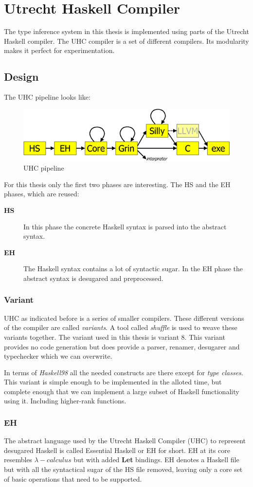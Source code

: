 \chapter{Utrecht Haskell Compiler}
The type inference system in this thesis is implemented using parts of the Utrecht Haskell compiler. The UHC compiler is a set of different compilers. Its modularity makes it perfect for experimentation.
\section{Design}
The UHC pipeline looks like:
\begin{figure}[H]
\includegraphics[scale=0.8]{ehc-dataflow2}
\caption{UHC pipeline}
\label{flow}
\end{figure}

For this thesis only the first two phases are interesting. The HS and the EH phases, which are reused:
\begin{description}
\item[\textbf{HS}] In this phase the concrete Haskell syntax is parsed into the abstract syntax. 
\item[\textbf{EH}] The Haskell syntax contains a lot of syntactic sugar. In the EH phase the abstract syntax is desugared and preprocessed.
\end{description}
\subsection{Variant}
UHC as indicated before is a series of smaller compilers. These different versions of the compiler are called \emph{variants}. A tool called \emph{shuffle} is used to weave these variants together. The variant used in this thesis is variant 8. This variant provides no code generation but does provide a parser, renamer, desugarer and typechecker which we can overwrite.

In terms of \emph{Haskell98} all the needed constructs are there except for \emph{type classes}. This variant is simple enough to be implemented in the alloted time, but complete enough that we can implement a large subset of Haskell functionality using it. Including higher-rank functions.

\subsection{EH}
The abstract language used by the Utrecht Haskell Compiler (UHC) to represent desugared Haskell is called Essential Haskell or EH for short. EH at its core resembles $\lambda-calculus$ but with added \textbf{Let} bindings. EH denotes a Haskell file but with all the syntactical sugar of the HS file removed, leaving only a core set of basic operations that need to be supported.
